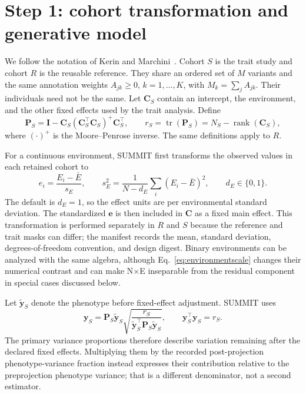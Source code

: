 \documentclass[11pt]{article}
\newcommand{\tr}{\operatorname{tr}}
\newcommand{\bI}{\bm I}
\newcommand{\bP}{\bm P}
\newcommand{\by}{\bm y}
\newcommand{\be}{\bm e}
\newcommand{\bC}{\bm C}
\begin{document}
\section{Step 1: cohort transformation and generative model}

We follow the notation of Kerin and Marchini~\cite{genie}.  Cohort $S$ is the
trait study and cohort $R$ is the reusable reference.  They share an ordered
set of $M$ variants and the same annotation weights $A_{jk}\geq0$,
$k=1,\ldots,K$, with $M_k=\sum_j A_{jk}$.  Their individuals need not be the
same.  Let $\bC_S$ contain an intercept, the environment, and the other fixed
effects used by the trait analysis.  Define
\begin{equation}
 \bP_S=\bI-\bC_S(\bC_S^\top\bC_S)^+\bC_S^\top,
 \qquad r_S=\tr(\bP_S)=N_S-\operatorname{rank}(\bC_S),
 \label{eq:projector}
\end{equation}
where $(\cdot)^+$ is the Moore--Penrose inverse.  The same definitions apply
to $R$.

For a continuous environment, SUMMIT first transforms the observed values in
each retained cohort to
\begin{equation}
 e_i=\frac{E_i-\bar E}{s_E},\qquad
 s_E^2=\frac{1}{N-d_E}\sum_i(E_i-\bar E)^2,\qquad d_E\in\{0,1\}.
 \label{eq:environmentscale}
\end{equation}
The default is $d_E=1$, so the effect units are per environmental standard
deviation.  The standardized $\be$ is then included in $\bC$ as a fixed main effect.  This
transformation is performed separately in $R$ and $S$ because the reference
and trait masks can differ; the manifest records the mean, standard deviation,
degrees-of-freedom convention, and design digest.  Binary environments can be
analyzed with the same algebra, although Eq.~\eqref{eq:environmentscale}
changes their numerical contrast and can make N$\times$E inseparable from the
residual component in special cases discussed below.

Let $\widetilde{\by}_S$ denote the phenotype before fixed-effect adjustment.
SUMMIT uses
\begin{equation}
 \by_S=\bP_S\widetilde{\by}_S
 \sqrt{\frac{r_S}{\widetilde{\by}_S^\top\bP_S
                         \widetilde{\by}_S}},
 \qquad \by_S^\top\by_S=r_S.
 \label{eq:phenotypescale}
\end{equation}
The primary variance proportions therefore describe variation remaining
after the declared fixed effects.  Multiplying them by the recorded
post-projection phenotype-variance fraction instead expresses their
contribution relative to the preprojection phenotype variance; that is a
different denominator, not a second estimator.
\end{document}
